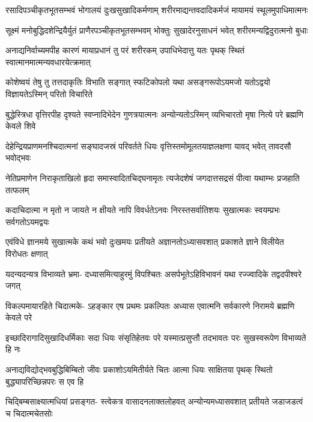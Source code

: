 \fourlineindentedshloka
{रसादिपञ्चीकृतभूतसम्भवं}
{भोगालयं दुःखसुखादिकर्मणाम्}
{शरीरमाद्यन्तवदादिकर्मजं}
{मायामयं स्थूलमुपाधिमात्मनः} %

\fourlineindentedshloka
{सूक्ष्मं मनोबुद्धिदशेन्द्रियैर्युतं}
{प्राणैरपञ्चीकृतभूतसम्भवम्}
{भोक्तुः सुखादेरनुसाधनं भवेत्}
{शरीरमन्यद्विदुरात्मनो बुधाः} %

\fourlineindentedshloka
{अनाद्यनिर्वाच्यमपीह कारणं}
{मायाप्रधानं तु परं शरीरकम्}
{उपाधिभेदात्तु यतः पृथक् स्थितं}
{स्वात्मानमात्मन्यवधारयेत्क्रमात्} %

\fourlineindentedshloka
{कोशेष्वयं तेषु तु तत्तदाकृतिः}
{विभाति सङ्गात् स्फटिकोपलो यथा}
{असङ्गरूपोऽयमजो यतोऽद्वयो}
{विज्ञायतेऽस्मिन् परितो विचारिते} %

\fourlineindentedshloka
{बुद्धेस्त्रिधा वृत्तिरपीह दृश्यते}
{स्वप्नादिभेदेन गुणत्रयात्मनः}
{अन्योन्यतोऽस्मिन् व्यभिचारतो मृषा}
{नित्ये परे ब्रह्मणि केवले शिवे} %

\fourlineindentedshloka
{देहेन्द्रियप्राणमनश्चिदात्मनां}
{सङ्घादजस्रं परिवर्तते धियः}
{वृत्तिस्तमोमूलतयाज्ञलक्षणा}
{यावद् भवेत् तावदसौ भवोद्भवः} %

\fourlineindentedshloka
{नेतिप्रमाणेन निराकृताखिलो}
{हृदा समास्वादितचिद्घनामृतः}
{त्यजेदशेषं जगदात्तसद्रसं}
{पीत्वा यथाम्भः प्रजहाति तत्फलम्} %

\fourlineindentedshloka
{कदाचिदात्मा न मृतो न जायते}
{न क्षीयते नापि विवर्धतेऽनवः}
{निरस्तसर्वातिशयः सुखात्मकः}
{स्वयम्प्रभः सर्वगतोऽयमद्वयः} %

\fourlineindentedshloka
{एवंविधे ज्ञानमये सुखात्मके}
{कथं भवो दुःखमयः प्रतीयते}
{अज्ञानतोऽध्यासवशात् प्रकाशते}
{ज्ञाने विलीयेत विरोधतः क्षणात्} %

\fourlineindentedshloka
{यदन्यदन्यत्र विभाव्यते भ्रमा-}
{दध्यासमित्याहुरमुं विपश्चितः}
{असर्पभूतेऽहिविभावनं यथा}
{रज्ज्वादिके तद्वदपीश्वरे जगत्} %

\fourlineindentedshloka
{विकल्पमायारहिते चिदात्मके-}
{ऽहङ्कार एष प्रथमः प्रकल्पितः}
{अध्यास एवात्मनि सर्वकारणे}
{निरामये ब्रह्मणि केवले परे} %

\fourlineindentedshloka
{इच्छादिरागादिसुखादिधर्मिकाः}
{सदा धियः संसृतिहेतवः परे}
{यस्मात्प्रसुप्तौ तदभावतः परः}
{सुखस्वरूपेण विभाव्यते हि नः} %

\fourlineindentedshloka
{अनाद्यविद्योद्भवबुद्धिबिम्बितो}
{जीवः प्रकाशोऽयमितीर्यते चितः}
{आत्मा धियः साक्षितया पृथक् स्थितो}
{बुद्ध्यापरिच्छिन्नपरः स एव हि} %

\fourlineindentedshloka
{चिद्बिम्बसाक्ष्यात्मधियां प्रसङ्गत-}
{स्त्वेकत्र वासादनलाक्तलोहवत्}
{अन्योन्यमध्यासवशात् प्रतीयते}
{जडाजडत्वं च चिदात्मचेतसोः} %

